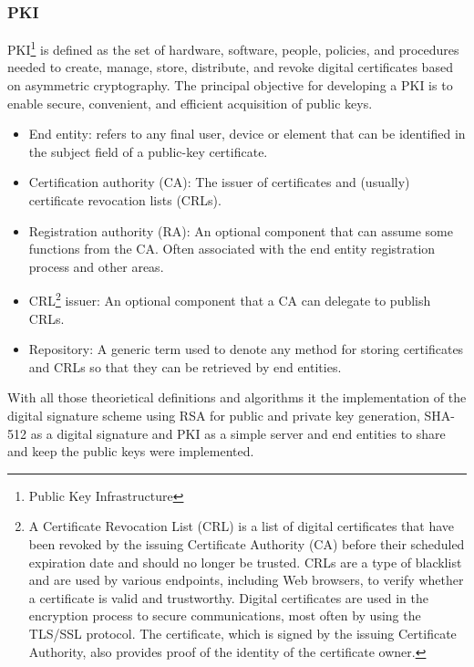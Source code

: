 \documentclass[letterpaper,12pt]{article}
\begin{document}
 \subsubsection{PKI}
    PKI\footnote{Public Key Infrastructure} is defined as the set of hardware, software, people, policies, and procedures needed to create, manage, store, distribute, and revoke digital certificates based on asymmetric cryptography. The principal objective for developing a PKI is to enable secure, convenient, and efficient acquisition of public keys. 
 \begin{itemize}
     \item End entity: refers to any final user, device or element that can be identified in the subject field of a public-key certificate.
     \item Certification authority (CA): The issuer of certificates and (usually) certificate revocation lists (CRLs).
     \item Registration authority (RA): An optional component that can assume some functions from the CA. Often associated with the end entity registration process and other areas.
    \item CRL\footnote{A Certificate Revocation List (CRL) is a list of digital certificates that have been revoked by the issuing Certificate Authority (CA) before their scheduled expiration date and should no longer be trusted. CRLs are a type of blacklist and are used by various endpoints, including Web browsers, to verify whether a certificate is valid and trustworthy. Digital certificates are used in the encryption process to secure communications, most often by using the TLS/SSL protocol. The certificate, which is signed by the issuing Certificate Authority, also provides proof of the identity of the certificate owner.\cite{CRL}} issuer: An optional component that a CA can delegate to publish CRLs.
    \item Repository: A generic term used to denote any method for storing certificates and CRLs so that they can be retrieved by end entities.
 \end{itemize}

With all those theorietical definitions and algorithms it the implementation of the digital signature scheme using RSA for public  and private key generation, SHA-512 as a digital signature and PKI as a simple server and end entities to share and keep the public keys were implemented.
        
    
\end{document}
